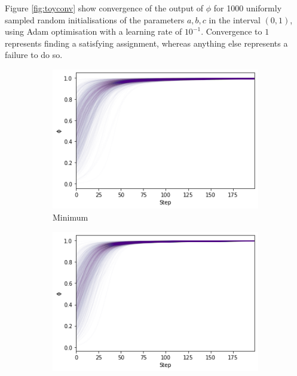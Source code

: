 Figure \ref{fig:toyconv} show convergence of the output of $\phi$ for 1000 uniformly sampled random initialisations of the parameters $a, b, c$ in the interval $(0,1)$, using Adam optimisation \cite{adam} with a learning rate of $10^{-1}$. Convergence to $1$ represents finding a satisfying assignment, whereas anything else represents a failure to do so.

\begin{figure}[h]
    \centering
    \begin{subfigure}[b]{0.45\textwidth}
        \centering
        \includegraphics[width=\textwidth]{imgs/toyconv_min.png}
        \caption{Minimum}
        \label{fig:toymin}
    \end{subfigure}
    \begin{subfigure}[b]{0.45\textwidth}
        \centering
        \includegraphics[width=\textwidth]{imgs/toyconv_prod.png}

\end{subfigure}
\end{figure}
